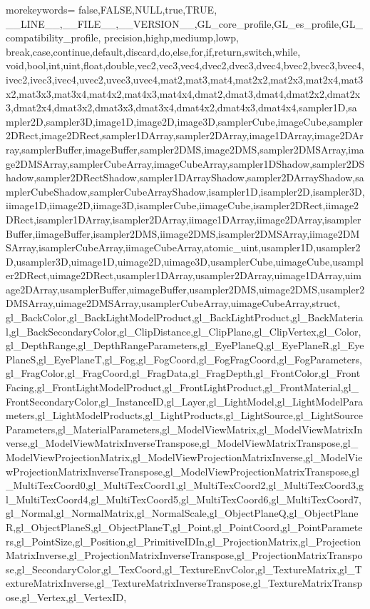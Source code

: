 %
{%
	morekeywords={%
		false,FALSE,NULL,true,TRUE,%
		__LINE__,__FILE__,__VERSION__,GL_core_profile,GL_es_profile,GL_compatibility_profile,%
		precision,highp,mediump,lowp,%
		break,case,continue,default,discard,do,else,for,if,return,switch,while,%
		void,bool,int,uint,float,double,vec2,vec3,vec4,dvec2,dvec3,dvec4,bvec2,bvec3,bvec4,ivec2,ivec3,ivec4,uvec2,uvec3,uvec4,mat2,mat3,mat4,mat2x2,mat2x3,mat2x4,mat3x2,mat3x3,mat3x4,mat4x2,mat4x3,mat4x4,dmat2,dmat3,dmat4,dmat2x2,dmat2x3,dmat2x4,dmat3x2,dmat3x3,dmat3x4,dmat4x2,dmat4x3,dmat4x4,sampler1D,sampler2D,sampler3D,image1D,image2D,image3D,samplerCube,imageCube,sampler2DRect,image2DRect,sampler1DArray,sampler2DArray,image1DArray,image2DArray,samplerBuffer,imageBuffer,sampler2DMS,image2DMS,sampler2DMSArray,image2DMSArray,samplerCubeArray,imageCubeArray,sampler1DShadow,sampler2DShadow,sampler2DRectShadow,sampler1DArrayShadow,sampler2DArrayShadow,samplerCubeShadow,samplerCubeArrayShadow,isampler1D,isampler2D,isampler3D,iimage1D,iimage2D,iimage3D,isamplerCube,iimageCube,isampler2DRect,iimage2DRect,isampler1DArray,isampler2DArray,iimage1DArray,iimage2DArray,isamplerBuffer,iimageBuffer,isampler2DMS,iimage2DMS,isampler2DMSArray,iimage2DMSArray,isamplerCubeArray,iimageCubeArray,atomic_uint,usampler1D,usampler2D,usampler3D,uimage1D,uimage2D,uimage3D,usamplerCube,uimageCube,usampler2DRect,uimage2DRect,usampler1DArray,usampler2DArray,uimage1DArray,uimage2DArray,usamplerBuffer,uimageBuffer,usampler2DMS,uimage2DMS,usampler2DMSArray,uimage2DMSArray,usamplerCubeArray,uimageCubeArray,struct,%
		gl_BackColor,gl_BackLightModelProduct,gl_BackLightProduct,gl_BackMaterial,gl_BackSecondaryColor,gl_ClipDistance,gl_ClipPlane,gl_ClipVertex,gl_Color,gl_DepthRange,gl_DepthRangeParameters,gl_EyePlaneQ,gl_EyePlaneR,gl_EyePlaneS,gl_EyePlaneT,gl_Fog,gl_FogCoord,gl_FogFragCoord,gl_FogParameters,gl_FragColor,gl_FragCoord,gl_FragData,gl_FragDepth,gl_FrontColor,gl_FrontFacing,gl_FrontLightModelProduct,gl_FrontLightProduct,gl_FrontMaterial,gl_FrontSecondaryColor,gl_InstanceID,gl_Layer,gl_LightModel,gl_LightModelParameters,gl_LightModelProducts,gl_LightProducts,gl_LightSource,gl_LightSourceParameters,gl_MaterialParameters,gl_ModelViewMatrix,gl_ModelViewMatrixInverse,gl_ModelViewMatrixInverseTranspose,gl_ModelViewMatrixTranspose,gl_ModelViewProjectionMatrix,gl_ModelViewProjectionMatrixInverse,gl_ModelViewProjectionMatrixInverseTranspose,gl_ModelViewProjectionMatrixTranspose,gl_MultiTexCoord0,gl_MultiTexCoord1,gl_MultiTexCoord2,gl_MultiTexCoord3,gl_MultiTexCoord4,gl_MultiTexCoord5,gl_MultiTexCoord6,gl_MultiTexCoord7,gl_Normal,gl_NormalMatrix,gl_NormalScale,gl_ObjectPlaneQ,gl_ObjectPlaneR,gl_ObjectPlaneS,gl_ObjectPlaneT,gl_Point,gl_PointCoord,gl_PointParameters,gl_PointSize,gl_Position,gl_PrimitiveIDIn,gl_ProjectionMatrix,gl_ProjectionMatrixInverse,gl_ProjectionMatrixInverseTranspose,gl_ProjectionMatrixTranspose,gl_SecondaryColor,gl_TexCoord,gl_TextureEnvColor,gl_TextureMatrix,gl_TextureMatrixInverse,gl_TextureMatrixInverseTranspose,gl_TextureMatrixTranspose,gl_Vertex,gl_VertexID,%
}}
